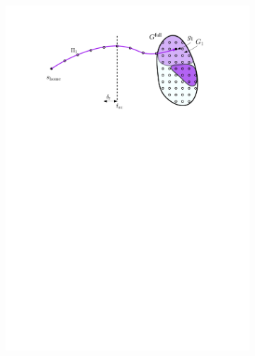 \documentclass[conference]{IEEEtran}
\begin{document}
\begin{figure}[t]
\begin{subfigure}{0.225\textwidth}
        \includegraphics[width=\textwidth]{3_preprocess_loop_2}
        \caption{}
        \label{fig:pl2}
    \end{subfigure} 
    \hspace{1mm}
    \begin{subfigure}{0.225\textwidth}

\end{subfigure}
\end{figure}
\end{document}
